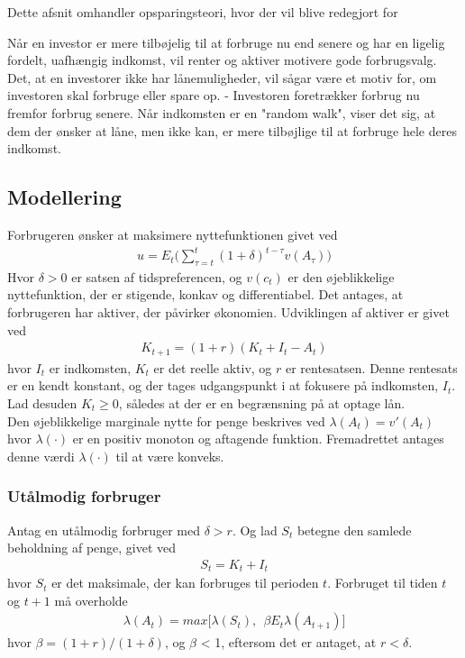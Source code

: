 

Dette afsnit omhandler opsparingsteori, hvor der vil blive redegjort for 


Når en investor er mere tilbøjelig til at forbruge nu end senere og har en ligelig fordelt, uafhængig indkomst, vil renter og aktiver motivere gode forbrugsvalg. 
Det, at en investorer ikke har lånemuligheder, vil sågar være et motiv for, om investoren skal forbruge eller spare op. - Investoren foretrækker forbrug nu fremfor forbrug senere.
Når indkomsten er en "random walk", viser det sig, at dem der ønsker at låne, men ikke kan, er mere tilbøjlige til at forbruge hele deres indkomst.

\iffalse
\subsection*{Modellering}
Forbrugeren ønsker at maksimere nyttefunktionen givet ved
\begin{align}
    u = E_t\big(\sum_{\tau=t}^t (1+\delta)^{t-\tau}v(A_\tau)\big)
\end{align}
Hvor $\delta > 0$ er satsen af tidspreferencen, og $v(c_t)$ er den øjeblikkelige nyttefunktion, der er stigende, konkav og differentiabel.
Det antages, at forbrugeren har aktiver, der påvirker økonomien. Udviklingen af aktiver er givet ved
\begin{align}
    K_{t+1}=(1+r)(K_t+I_t-A_t)
\end{align}
hvor $I_t$ er indkomsten, $K_t$ er det reelle aktiv, og $r$ er rentesatsen. Denne rentesats er en kendt konstant, og der tages udgangspunkt i at fokusere på indkomsten, $I_t$. 
Lad desuden $K_t \geq 0$, således at der er en begrænsning på at optage lån.\\
Den øjeblikkelige marginale nytte for penge beskrives ved
$\lambda(A_t)=v'(A_t)$
hvor $\lambda(\cdot)$ er en positiv monoton og aftagende funktion. Fremadrettet antages denne værdi $\lambda(\cdot)$ til at være konveks. 



\subsubsection{Utålmodig forbruger}
Antag en utålmodig forbruger med $\delta > r$. Og lad $S_t$ betegne den samlede beholdning af penge, givet ved
\begin{align}
    S_t = K_t + I_t
\end{align}
hvor $S_t$ er det maksimale, der kan forbruges til perioden $t$. Forbruget til tiden $t$ og $t+1$ må overholde
\begin{align}
    \lambda(A_t) = max\Big [\lambda(S_t), \ \ \beta E_t \lambda(A_{t+1})\Big]
\end{align}
hvor $\beta=(1+r)/(1+\delta)$, og $\beta$ < 1, eftersom det er antaget, at $r < \delta$.

